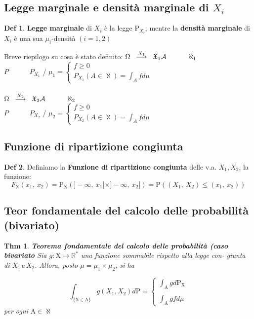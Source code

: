 \documentclass[a4paper,11pt]{article}
\theoremstyle{plain}
\newtheorem{thm}{Thm}[section]
\theoremstyle{definition}
\newtheorem{defn}{Def}[section]
\theoremstyle{remark}
\begin{document}
\subsection{Legge marginale e densità marginale di $X_{i}$}
\begin{defn}
\textbf{Legge marginale} di $X_{i}$ \`{e} la legge $\mathrm{P}_{X_{i}}$; mentre la \textbf{densità marginale} di $X_{i}$  \`{e} una sua $\mu_{i}$-densit\`{a} $(i=1,2)$
\end{defn}

\noindent
Breve riepilogo su cosa è stato definito:
\noindent
$\Omega \;\; \overset{X_1}{\longrightarrow} \;\; \mathfrak{X}_1\\
\mathcal{A} \;\;\;\;\;\;\; \,\,\,\;\;\; \aleph_1  \,\,\,\;\;\;$\\
$P \;\;\;\;\;\;\;\;\;\;\; P_{X_1}$ / $\mu_1=\left\{\begin{matrix}
f\geq 0 \\ 
P_{X_1}(A \in \aleph)=\int_A f d\mu 
\end{matrix}\right.$ \\
\\
$\Omega \;\; \overset{X_2}{\longrightarrow} \;\; \mathfrak{X}_2\\
\mathcal{A} \;\;\;\;\;\;\; \,\,\,\;\;\; \aleph_2  \,\,\,\;\;\;$\\
$P \;\;\;\;\;\;\;\;\;\;\; P_{X_2}$ / $\mu_2=\left\{\begin{matrix}
f\geq 0 \\ 
P_{X_2}(A \in \aleph)=\int_A f d\mu 
\end{matrix}\right.$
\\


\subsection{Funzione di ripartizione congiunta}
\begin{defn} Definiamo la \textbf{Funzione di ripartizione congiunta}
delle v.a. $ X_{1}, X_{2}$, la funzione:
$$
F_{\mathrm{X}}(x_{1},\ x_{2})=\mathrm{P}_{\mathrm{X}}\left(]-\infty,\ x_{1}]\times]-\infty,\ x_{2}]\right)=\mathrm{P}((X_{1},\ X_{2})\leq(x_{1},\ x_{2}))
$$
\end{defn}

\subsection{Teor fondamentale del calcolo delle probabilità (bivariato)}
\begin{thm}\textbf{Teorema fondamentale del calcolo delle probabilità (caso bivariato} Sia $g:\mathrm{X}\mapsto \mathbb{R}^{*}$ una funzione sommabile rispetto alla legge con- giunta di $X_{1} \, \mathrm{e} \, X_{2}$. Allora, posto $\mu=\mu_{1}\times\mu_{2}$, si ha

$$\displaystyle \int_{\{\mathrm{X}\in \mathrm{A}\}}g(X_{1}, X_{2})d\mathrm{P}=\left\{\begin{array}{l}
\displaystyle \int_{\mathrm{A}}gd\mathrm{P}_{\mathrm{X}}\\
\\
\displaystyle \int_{\mathrm{A}}gfd\mu
\end{array}\right.$$
per ogni $\mathrm{A}\in\aleph$
\end{thm}
\end{document}
